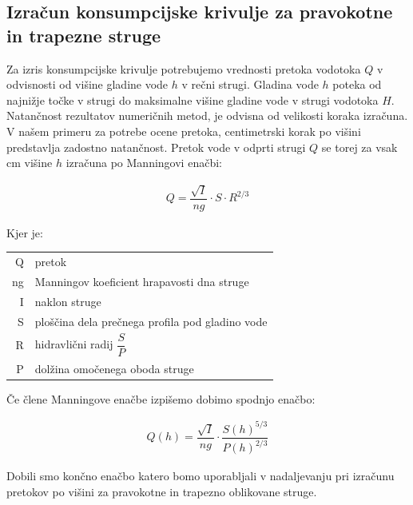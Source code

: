 \subsection{Izračun konsumpcijske krivulje za pravokotne in trapezne struge} \label{sec:teorija_trapeznaMetoda}
Za izris konsumpcijske krivulje potrebujemo vrednosti pretoka vodotoka $Q$ v odvisnosti od višine gladine vode $h$ v rečni strugi. Gladina vode $h$ poteka od najnižje točke v strugi do maksimalne višine gladine vode v strugi vodotoka $H$. Natančnost rezultatov numeričnih metod, je odvisna od velikosti koraka izračuna. V našem primeru za potrebe ocene pretoka, centimetrski korak po višini predstavlja zadostno natančnost. Pretok vode v odprti strugi $Q$ se torej za vsak cm višine $h$ izračuna po Manningovi enačbi: 

\begin{ceqn}
\begin{align}
Q = \dfrac{\sqrt{I}}{ng} \cdot S \cdot R^{2/3} \label{eq:ManningovaEnacba}
\end{align}
\end{ceqn}


Kjer je:
\begin{table}[H]
	\begin{tabular}{r|p{10cm}}
		Q & pretok \\
		ng & Manningov koeficient hrapavosti dna struge\\
		I & naklon struge \\
		S & ploščina dela prečnega profila pod gladino vode\\
		R & hidravlični radij $\dfrac{S}{P}$\\
		P & dolžina omočenega oboda struge\\
	\end{tabular}
\end{table}

Če člene Manningove enačbe izpišemo dobimo spodnjo enačbo:

\begin{ceqn}
	\begin{align}
	Q(h) = \dfrac{\sqrt{I}}{ng} \cdot \dfrac{S(h)^{5/3}}{P(h)^{2/3}} \label{eq:ManningovaEnacba}
	\end{align}
\end{ceqn}


Dobili smo končno enačbo katero bomo uporabljali v nadaljevanju pri izračunu pretokov po višini za pravokotne in trapezno oblikovane struge.



